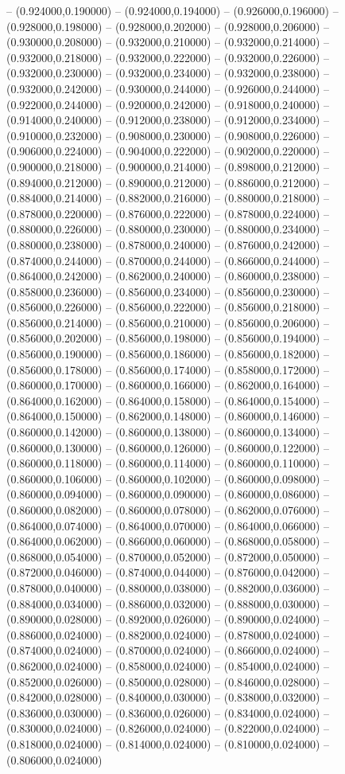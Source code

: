 -- (0.924000,0.190000) -- (0.924000,0.194000) -- (0.926000,0.196000) -- (0.928000,0.198000) -- (0.928000,0.202000) -- (0.928000,0.206000) -- (0.930000,0.208000) -- (0.932000,0.210000) -- (0.932000,0.214000) -- (0.932000,0.218000) -- (0.932000,0.222000) -- (0.932000,0.226000) -- (0.932000,0.230000) -- (0.932000,0.234000) -- (0.932000,0.238000) -- (0.932000,0.242000) -- (0.930000,0.244000) -- (0.926000,0.244000) -- (0.922000,0.244000) -- (0.920000,0.242000) -- (0.918000,0.240000) -- (0.914000,0.240000) -- (0.912000,0.238000) -- (0.912000,0.234000) -- (0.910000,0.232000) -- (0.908000,0.230000) -- (0.908000,0.226000) -- (0.906000,0.224000) -- (0.904000,0.222000) -- (0.902000,0.220000) -- (0.900000,0.218000) -- (0.900000,0.214000) -- (0.898000,0.212000) -- (0.894000,0.212000) -- (0.890000,0.212000) -- (0.886000,0.212000) -- (0.884000,0.214000) -- (0.882000,0.216000) -- (0.880000,0.218000) -- (0.878000,0.220000) -- (0.876000,0.222000) -- (0.878000,0.224000) -- (0.880000,0.226000) -- (0.880000,0.230000) -- (0.880000,0.234000) -- (0.880000,0.238000) -- (0.878000,0.240000) -- (0.876000,0.242000) -- (0.874000,0.244000) -- (0.870000,0.244000) -- (0.866000,0.244000) -- (0.864000,0.242000) -- (0.862000,0.240000) -- (0.860000,0.238000) -- (0.858000,0.236000) -- (0.856000,0.234000) -- (0.856000,0.230000) -- (0.856000,0.226000) -- (0.856000,0.222000) -- (0.856000,0.218000) -- (0.856000,0.214000) -- (0.856000,0.210000) -- (0.856000,0.206000) -- (0.856000,0.202000) -- (0.856000,0.198000) -- (0.856000,0.194000) -- (0.856000,0.190000) -- (0.856000,0.186000) -- (0.856000,0.182000) -- (0.856000,0.178000) -- (0.856000,0.174000) -- (0.858000,0.172000) -- (0.860000,0.170000) -- (0.860000,0.166000) -- (0.862000,0.164000) -- (0.864000,0.162000) -- (0.864000,0.158000) -- (0.864000,0.154000) -- (0.864000,0.150000) -- (0.862000,0.148000) -- (0.860000,0.146000) -- (0.860000,0.142000) -- (0.860000,0.138000) -- (0.860000,0.134000) -- (0.860000,0.130000) -- (0.860000,0.126000) -- (0.860000,0.122000) -- (0.860000,0.118000) -- (0.860000,0.114000) -- (0.860000,0.110000) -- (0.860000,0.106000) -- (0.860000,0.102000) -- (0.860000,0.098000) -- (0.860000,0.094000) -- (0.860000,0.090000) -- (0.860000,0.086000) -- (0.860000,0.082000) -- (0.860000,0.078000) -- (0.862000,0.076000) -- (0.864000,0.074000) -- (0.864000,0.070000) -- (0.864000,0.066000) -- (0.864000,0.062000) -- (0.866000,0.060000) -- (0.868000,0.058000) -- (0.868000,0.054000) -- (0.870000,0.052000) -- (0.872000,0.050000) -- (0.872000,0.046000) -- (0.874000,0.044000) -- (0.876000,0.042000) -- (0.878000,0.040000) -- (0.880000,0.038000) -- (0.882000,0.036000) -- (0.884000,0.034000) -- (0.886000,0.032000) -- (0.888000,0.030000) -- (0.890000,0.028000) -- (0.892000,0.026000) -- (0.890000,0.024000) -- (0.886000,0.024000) -- (0.882000,0.024000) -- (0.878000,0.024000) -- (0.874000,0.024000) -- (0.870000,0.024000) -- (0.866000,0.024000) -- (0.862000,0.024000) -- (0.858000,0.024000) -- (0.854000,0.024000) -- (0.852000,0.026000) -- (0.850000,0.028000) -- (0.846000,0.028000) -- (0.842000,0.028000) -- (0.840000,0.030000) -- (0.838000,0.032000) -- (0.836000,0.030000) -- (0.836000,0.026000) -- (0.834000,0.024000) -- (0.830000,0.024000) -- (0.826000,0.024000) -- (0.822000,0.024000) -- (0.818000,0.024000) -- (0.814000,0.024000) -- (0.810000,0.024000) -- (0.806000,0.024000) 